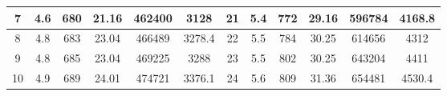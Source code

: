 \begin{table}[]
\begin{tabular}{|ccccccc|c|c|c|c|c|}
\multicolumn{1}{|c|}{7}           & \multicolumn{1}{c|}{4.6}                                                                    & \multicolumn{1}{c|}{680}                                                                     & \multicolumn{1}{c|}{21.16}          & \multicolumn{1}{c|}{462400}         & \multicolumn{1}{c|}{3128}        & 21          & 5.4                                                                     & 772                                                                       & 29.16                          & 596784                           & 4168.8                          \\ \hline
\multicolumn{1}{|c|}{8}           & \multicolumn{1}{c|}{4.8}                                                                    & \multicolumn{1}{c|}{683}                                                                     & \multicolumn{1}{c|}{23.04}          & \multicolumn{1}{c|}{466489}         & \multicolumn{1}{c|}{3278.4}      & 22          & 5.5                                                                     & 784                                                                       & 30.25                          & 614656                           & 4312                            \\ \hline
\multicolumn{1}{|c|}{9}           & \multicolumn{1}{c|}{4.8}                                                                    & \multicolumn{1}{c|}{685}                                                                     & \multicolumn{1}{c|}{23.04}          & \multicolumn{1}{c|}{469225}         & \multicolumn{1}{c|}{3288}        & 23          & 5.5                                                                     & 802                                                                       & 30.25                          & 643204                           & 4411                            \\ \hline
\multicolumn{1}{|c|}{10}          & \multicolumn{1}{c|}{4.9}                                                                    & \multicolumn{1}{c|}{689}                                                                     & \multicolumn{1}{c|}{24.01}          & \multicolumn{1}{c|}{474721}         & \multicolumn{1}{c|}{3376.1}      & 24          & 5.6                                                                     & 809                                                                       & 31.36                          & 654481                           & 4530.4                          \\ \hline

\end{tabular}
\end{table}
